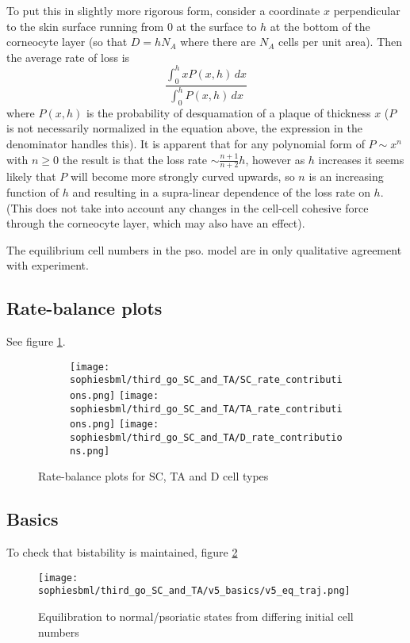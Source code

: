 \documentclass[a4paper,10pt]{report}
\newcommand{\psortbase}{/home/ngrs2/work/bsu/PSORT_Zuliani_Reynolds/}
\newcommand{\sbmlbase}{\psortbase/sbml-sh/}
\newcommand{\sophiesbml}{\sbmlbase/sophie_like}
\begin{document}
To put this in slightly more rigorous form, 
consider a coordinate $x$ perpendicular to the skin surface running from 0 at the surface to $h$ at the bottom 
of the corneocyte layer (so that $D=hN_A$ where there are $N_A$ cells per unit area). Then the average rate of loss is 
\[ 
\frac { \int_0^h x P(x,h)\,dx} { \int_0^h P(x,h)\,dx}
\]
where $P(x,h)$ is the probability of desquamation of a plaque of thickness $x$ ($P$ is not necessarily normalized in the equation above, the expression in the denominator handles this). It is apparent that for any polynomial form of $P \sim x^n$ with $n\geq 0$ the 
result is that the loss rate $\sim \frac{n+1}{n+2} h$, however as $h$ increases it seems likely that $P$ will become more strongly curved upwards, so $n$ is an increasing function of $h$ and resulting in a supra-linear dependence of the loss rate on $h$. (This does not take into account any changes in the cell-cell cohesive force through the corneocyte layer, which may also have an effect). 

The equilibrium cell numbers in the pso. model are in only qualitative agreement with experiment. 


\subsection{Rate-balance plots}

See figure   \ref{fig:thirdsophie_ratebalance}.

\begin{figure}[h!]
  \begin{subfigure}{\textwidth}
    \texttt{[image: \\sophiesbml/third\_go\_SC\_and\_TA/SC\_rate\_contributions.png]}
    \texttt{[image: \\sophiesbml/third\_go\_SC\_and\_TA/TA\_rate\_contributions.png]}
    \texttt{[image: \\sophiesbml/third\_go\_SC\_and\_TA/D\_rate\_contributions.png]}
  \end{subfigure}
  \caption{Rate-balance plots for SC, TA and D cell types}
  \label{fig:thirdsophie_ratebalance}
\end{figure}


\subsection{Basics}
To check that bistability is maintained, figure \ref{fig:thirdsophie_basics}

\begin{figure}[h!]
    \centering
    \texttt{[image: \\sophiesbml/third\_go\_SC\_and\_TA/v5\_basics/v5\_eq\_traj.png]}
  \caption{Equilibration to normal/psoriatic states from differing initial cell numbers}
  \label{fig:thirdsophie_basics}
\end{figure}
\end{document}
